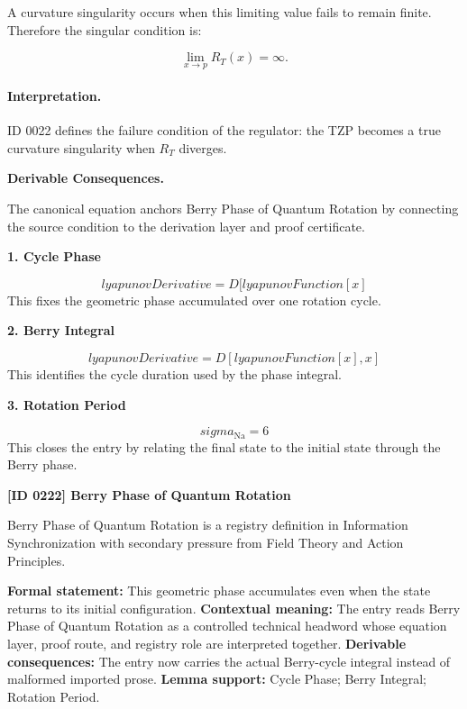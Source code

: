 A curvature singularity occurs when this limiting value fails to remain finite. Therefore the singular condition is:

\begin{equation}
\boxed{
\lim_{x\to p}R_T(x)=\infty .
}
\end{equation}

\paragraph{Interpretation.}
ID 0022 defines the failure condition of the regulator: the TZP becomes a true curvature singularity when $R_T$ diverges.

\par\vspace{0.35em}
\noindent\textbf{Derivable Consequences.}\quad
\begingroup
\footnotesize
\raggedright
The canonical equation anchors Berry Phase of Quantum Rotation by connecting the source condition to the derivation layer and proof certificate.
\par\endgroup

\noindent\textbf{1. Cycle Phase}\par
\[
lyapunovDerivative = D[lyapunovFunction[x]
\]
\noindent This fixes the geometric phase accumulated over one rotation cycle.\par
\noindent\textbf{2. Berry Integral}\par
\[
lyapunovDerivative = D[lyapunovFunction[x], x]
\]
\noindent This identifies the cycle duration used by the phase integral.\par
\noindent\textbf{3. Rotation Period}\par
\[
sigma_{\mathrm{Na}} = 6
\]
\noindent This closes the entry by relating the final state to the initial state through the Berry phase.\par

\clearpage
\noindent\textbf{[ID 0222] Berry Phase of Quantum Rotation}\par
\vspace{0.35em}
\begingroup\small
{}
Berry Phase of Quantum Rotation is a registry definition in Information Synchronization with secondary pressure from Field Theory and Action Principles.

\begingroup\footnotesize\setlength{\emergencystretch}{3em}\sloppy
\textbf{Formal statement:} This geometric phase accumulates even when the state returns to its initial configuration. \textbf{Contextual meaning:} The entry reads Berry Phase of Quantum Rotation as a controlled technical headword whose equation layer, proof route, and registry role are interpreted together. \textbf{Derivable consequences:} The entry now carries the actual Berry-cycle integral instead of malformed imported prose. \textbf{Lemma support:} Cycle Phase; Berry Integral; Rotation Period.\par
\endgroup

